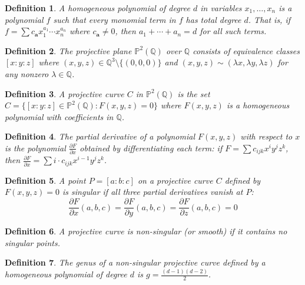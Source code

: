 \documentclass{article}
\newtheorem{definition}{Definition}
\begin{document}
\begin{definition}
  A homogeneous polynomial of degree $d$ in variables $x_1, \ldots, x_n$ is a
  polynomial $f$ such that every monomial term in $f$ has total degree $d$.
  That is, if $f = \sum c_{\mathbf{a}} x_1^{a_1} \cdots x_n^{a_n}$ where
  $c_{\mathbf{a}} \neq 0$, then $a_1 + \cdots + a_n = d$ for all such terms.
\end{definition}

\begin{definition}
  The projective plane $\mathbb{P}^2 (\mathbb{Q})$ over $\mathbb{Q}$ consists
  of equivalence classes $[x : y : z]$ where $(x, y, z) \in \mathbb{Q}^3
  \setminus \{(0, 0, 0)\}$ and $(x, y, z) \sim (\lambda x, \lambda y, \lambda
  z)$ for any nonzero $\lambda \in \mathbb{Q}$.
\end{definition}

\begin{definition}
  A projective curve $C$ in $\mathbb{P}^2 (\mathbb{Q})$ is the set $C = \{[x :
  y : z] \in \mathbb{P}^2 (\mathbb{Q}) : F (x, y, z) = 0\}$ where $F (x, y,
  z)$ is a homogeneous polynomial with coefficients in $\mathbb{Q}$.
\end{definition}

\begin{definition}
  The partial derivative of a polynomial $F (x, y, z)$ with respect to $x$ is
  the polynomial $\frac{\partial F}{\partial x}$ obtained by differentiating
  each term: if $F = \sum c_{ijk} x^i y^j z^k$, then $\frac{\partial
  F}{\partial x} = \sum i \cdot c_{ijk} x^{i - 1} y^j z^k$.
\end{definition}

\begin{definition}
  A point $P = [a : b : c]$ on a projective curve $C$ defined by $F (x, y, z)
  = 0$ is singular if all three partial derivatives vanish at $P$:
  \[ \frac{\partial F}{\partial x}  (a, b, c) = \frac{\partial F}{\partial y} 
     (a, b, c) = \frac{\partial F}{\partial z}  (a, b, c) = 0 \]
\end{definition}

\begin{definition}
  A projective curve is non-singular (or smooth) if it contains no singular
  points.
\end{definition}

\begin{definition}
  The genus of a non-singular projective curve defined by a homogeneous
  polynomial of degree $d$ is $g = \frac{(d - 1)  (d - 2)}{2}$.
\end{definition}
\end{document}
